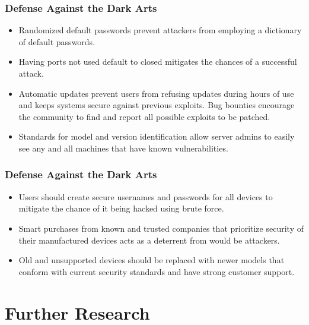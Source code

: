 \documentclass{beamer}
\begin{document}
\begin{frame}
    \frametitle{Defense Against the Dark Arts}
    \begin{itemize}
        \item<+-> Randomized default passwords prevent attackers from employing a dictionary of default passwords.
        \item<+-> Having ports not used default to closed mitigates the chances of a successful attack.
        \item<+-> Automatic updates prevent users from refusing updates during hours of use and keeps systems secure against previous exploits. Bug bounties encourage the community to find and report all possible exploits to be patched.
        \item<+-> Standards for model and version identification allow server admins to easily see any and all machines that have known vulnerabilities.
    \end{itemize}
\end{frame}

\begin{frame}
    \frametitle{Defense Against the Dark Arts}
    \begin{itemize}
        \item<+-> Users should create secure usernames and passwords for all devices to mitigate the chance of it being hacked using brute force.
        \item<+-> Smart purchases from known and trusted companies that prioritize security of their manufactured devices acts as a deterrent from would be attackers.
        \item<+-> Old and unsupported devices should be replaced with newer models that conform with current security standards and have strong customer support.
    \end{itemize}
    
\end{frame}

\section{Further Research}
\end{document}
